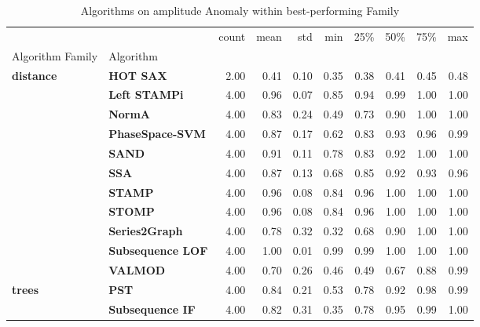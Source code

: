 \begin{table}
\caption{Algorithms on amplitude Anomaly within best-performing Family}
\label{tab:bp-amplitude}
\begin{tabular}{llrrrrrrrr}
\toprule
 &  & count & mean & std & min & 25\% & 50\% & 75\% & max \\
Algorithm Family & Algorithm &  &  &  &  &  &  &  &  \\
\midrule
\multirow[t]{11}{*}{\textbf{distance}} & \textbf{HOT SAX} & 2.00 & 0.41 & 0.10 & 0.35 & 0.38 & 0.41 & 0.45 & 0.48 \\
\textbf{} & \textbf{Left STAMPi} & 4.00 & 0.96 & 0.07 & 0.85 & 0.94 & 0.99 & 1.00 & 1.00 \\
\textbf{} & \textbf{NormA} & 4.00 & 0.83 & 0.24 & 0.49 & 0.73 & 0.90 & 1.00 & 1.00 \\
\textbf{} & \textbf{PhaseSpace-SVM} & 4.00 & 0.87 & 0.17 & 0.62 & 0.83 & 0.93 & 0.96 & 0.99 \\
\textbf{} & \textbf{SAND} & 4.00 & 0.91 & 0.11 & 0.78 & 0.83 & 0.92 & 1.00 & 1.00 \\
\textbf{} & \textbf{SSA} & 4.00 & 0.87 & 0.13 & 0.68 & 0.85 & 0.92 & 0.93 & 0.96 \\
\textbf{} & \textbf{STAMP} & 4.00 & 0.96 & 0.08 & 0.84 & 0.96 & 1.00 & 1.00 & 1.00 \\
\textbf{} & \textbf{STOMP} & 4.00 & 0.96 & 0.08 & 0.84 & 0.96 & 1.00 & 1.00 & 1.00 \\
\textbf{} & \textbf{Series2Graph} & 4.00 & 0.78 & 0.32 & 0.32 & 0.68 & 0.90 & 1.00 & 1.00 \\
\textbf{} & \textbf{Subsequence LOF} & 4.00 & 1.00 & 0.01 & 0.99 & 0.99 & 1.00 & 1.00 & 1.00 \\
\textbf{} & \textbf{VALMOD} & 4.00 & 0.70 & 0.26 & 0.46 & 0.49 & 0.67 & 0.88 & 0.99 \\
\cline{1-10}
\multirow[t]{2}{*}{\textbf{trees}} & \textbf{PST} & 4.00 & 0.84 & 0.21 & 0.53 & 0.78 & 0.92 & 0.98 & 0.99 \\
\textbf{} & \textbf{Subsequence IF} & 4.00 & 0.82 & 0.31 & 0.35 & 0.78 & 0.95 & 0.99 & 1.00 \\
\cline{1-10}
\bottomrule
\end{tabular}
\end{table}
